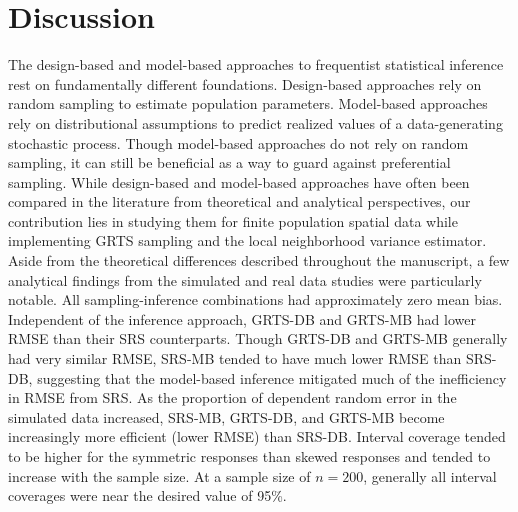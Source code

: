 \documentclass[]{elsarticle} %
\begin{document}
\hypertarget{sec:discussion}{%
\section{Discussion}\label{sec:discussion}}

The design-based and model-based approaches to frequentist statistical
inference rest on fundamentally different foundations. Design-based
approaches rely on random sampling to estimate population parameters.
Model-based approaches rely on distributional assumptions to predict
realized values of a data-generating stochastic process. Though
model-based approaches do not rely on random sampling, it can still be
beneficial as a way to guard against preferential sampling. While
design-based and model-based approaches have often been compared in the
literature from theoretical and analytical perspectives, our
contribution lies in studying them for finite population spatial data
while implementing GRTS sampling and the local neighborhood variance
estimator. Aside from the theoretical differences described throughout
the manuscript, a few analytical findings from the simulated and real
data studies were particularly notable. All sampling-inference
combinations had approximately zero mean bias. Independent of the
inference approach, GRTS-DB and GRTS-MB had lower RMSE than their SRS
counterparts. Though GRTS-DB and GRTS-MB generally had very similar
RMSE, SRS-MB tended to have much lower RMSE than SRS-DB, suggesting that
the model-based inference mitigated much of the inefficiency in RMSE
from SRS. As the proportion of dependent random error in the simulated
data increased, SRS-MB, GRTS-DB, and GRTS-MB become increasingly more
efficient (lower RMSE) than SRS-DB. Interval coverage tended to be
higher for the symmetric responses than skewed responses and tended to
increase with the sample size. At a sample size of \(n = 200\),
generally all interval coverages were near the desired value of 95\%.
\end{document}
